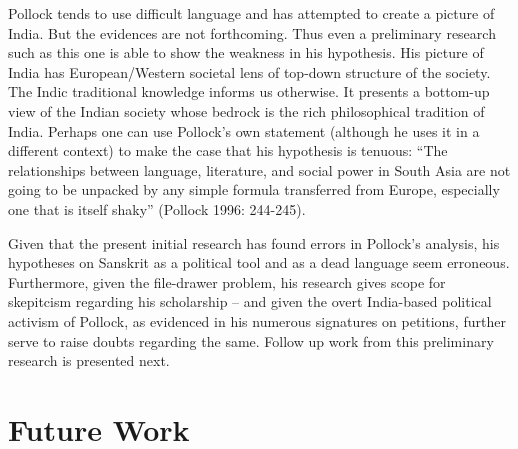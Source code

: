 Pollock tends to use difficult language and has attempted to create a picture of India. But the evidences are not forthcoming. Thus even a preliminary research such as this one is able to show the weakness in his hypothesis. His picture of India has European/Western societal lens of top-down structure of the society. The Indic traditional knowledge informs us otherwise. It presents a bottom-up view of the Indian society whose bedrock is the rich philosophical tradition of India. Perhaps one can use Pollock’s own statement (although he uses it in a different context) to make the case that his hypothesis is tenuous: “The relationships between language, literature, and social power in South Asia are not going to be unpacked by any simple formula transferred from Europe, especially one that is itself shaky” (Pollock 1996: 244-245).

Given that the present initial research has found errors in Pollock’s analysis, his hypotheses on Sanskrit as a political tool and as a dead language seem erroneous. Furthermore, given the file-drawer problem, his research gives scope for skepitcism regarding his scholarship – and given the overt India-based political activism of Pollock, as evidenced in his numerous signatures on petitions, further serve to raise doubts regarding the same. Follow up work from this preliminary research is presented next.


\section*{Future Work}

